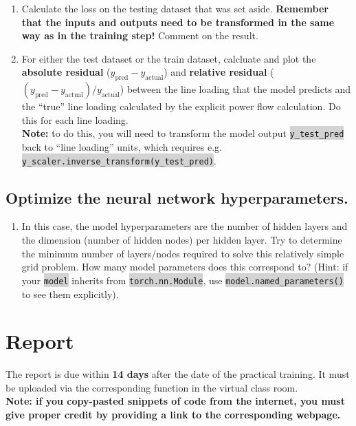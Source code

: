 \documentclass[11pt]{article}
\newcommand{\code}[1]{\colorbox{lightgray}{\texttt{#1}}}
\begin{document}
\begin{enumerate}
\item Calculate the loss on the testing dataset that was set aside.
  \textbf{Remember that the inputs and outputs need to be transformed in the same way as in the training step!}
  Comment on the result.
\item For either the test dataset or the train dataset, calcluate and plot the {\textbf{absolute residual}}
  ($y_\mathrm{pred}-y_\mathrm{actual}$) and {\textbf{relative residual}} ($(y_\mathrm{pred}-y_\mathrm{actual})/y_\mathrm{actual}$)
  between the line loading that the model predicts and the ``true'' line loading calculated
  by the explicit power flow calculation. Do this for each line loading.\\[2mm]
  {\textbf{Note:}} to do this, you will need to transform the model output \code{y\_test\_pred} back to ``line loading'' units,
  which requires e.g. \code{y\_scaler.inverse\_transform(y\_test\_pred)}.
\end{enumerate}

\subsection{Optimize the neural network hyperparameters.}

\begin{enumerate}
\item In this case, the model hyperparameters are the number of hidden layers and the
  dimension (number of hidden nodes) per hidden layer. Try to determine the minimum number
  of layers/nodes required to solve this relatively simple grid problem. How many model parameters
  does this correspond to? (Hint: if your \code{model} inherits from \code{torch.nn.Module}, use
  \code{model.named\_parameters()} to see them explicitly).
\end{enumerate}

\section{Report}

The report is due within \textbf{14 days} after the date of the practical training. It must be
uploaded via the corresponding function in the virtual class room.\\

{\color{red}\textbf{Note: if you copy-pasted snippets of code from the internet, you must give
    proper credit by providing a link to the corresponding webpage.}}\\
\end{document}
